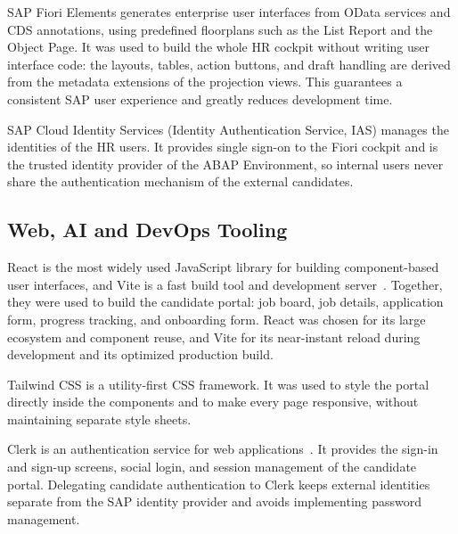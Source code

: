 SAP Fiori Elements generates enterprise user interfaces from OData services and CDS annotations, using predefined floorplans such as the List Report and the Object Page. It was used to build the whole HR cockpit without writing user interface code: the layouts, tables, action buttons, and draft handling are derived from the metadata extensions of the projection views. This guarantees a consistent SAP user experience and greatly reduces development time.

SAP Cloud Identity Services (Identity Authentication Service, IAS) manages the identities of the HR users. It provides single sign-on to the Fiori cockpit and is the trusted identity provider of the ABAP Environment, so internal users never share the authentication mechanism of the external candidates.

\subsection{Web, AI and DevOps Tooling}
\label{subsec:web_ai_tooling}

React is the most widely used JavaScript library for building component-based user interfaces, and Vite is a fast build tool and development server~\cite{react}. Together, they were used to build the candidate portal: job board, job details, application form, progress tracking, and onboarding form. React was chosen for its large ecosystem and component reuse, and Vite for its near-instant reload during development and its optimized production build.

Tailwind CSS is a utility-first CSS framework. It was used to style the portal directly inside the components and to make every page responsive, without maintaining separate style sheets.

Clerk is an authentication service for web applications~\cite{clerk}. It provides the sign-in and sign-up screens, social login, and session management of the candidate portal. Delegating candidate authentication to Clerk keeps external identities separate from the SAP identity provider and avoids implementing password management.

